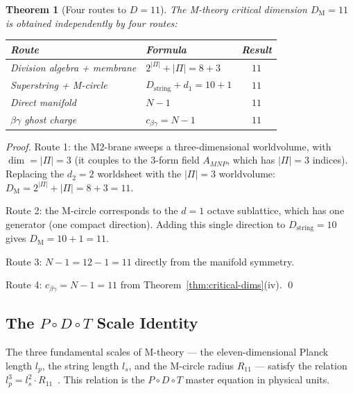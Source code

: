 \documentclass[11pt,a4paper]{article}
\newtheorem{theorem}{Theorem}[section]
\theoremstyle{definition}
\theoremstyle{remark}
\begin{document}
\begin{theorem}[Four routes to $D = 11$]\label{thm:D11}
The M-theory critical dimension $D_{\mathrm{M}} = 11$ is obtained independently by four routes:
\begin{center}
\begin{tabular}{@{}l l c@{}}
\toprule
Route & Formula & Result \\
\midrule
Division algebra + membrane & $2^{|\Pi|} + |\Pi| = 8 + 3$ & $11$ \\
Superstring + M-circle & $D_{\mathrm{string}} + d_{1} = 10 + 1$ & $11$ \\
Direct manifold & $N - 1$ & $11$ \\
$\beta\gamma$ ghost charge & $c_{\beta\gamma} = N - 1$ & $11$ \\
\bottomrule
\end{tabular}
\end{center}
\end{theorem}

\begin{proof}
Route 1: the M$2$-brane sweeps a three-dimensional worldvolume, with $\dim = |\Pi| = 3$ (it couples to the $3$-form field $A_{MNP}$, which has $|\Pi| = 3$ indices). Replacing the $d_{2} = 2$ worldsheet with the $|\Pi| = 3$ worldvolume: $D_{\mathrm{M}} = 2^{|\Pi|} + |\Pi| = 8 + 3 = 11$.

Route 2: the M-circle corresponds to the $d = 1$ octave sublattice, which has one generator (one compact direction). Adding this single direction to $D_{\mathrm{string}} = 10$ gives $D_{\mathrm{M}} = 10 + 1 = 11$.

Route 3: $N - 1 = 12 - 1 = 11$ directly from the manifold symmetry.

Route 4: $c_{\beta\gamma} = N - 1 = 11$ from Theorem~\ref{thm:critical-dims}(iv). \qed
\end{proof}

\subsection{The $P \circ D \circ T$ Scale Identity}\label{subsec:pdt-scale}

The three fundamental scales of M-theory --- the eleven-dimensional Planck length $l_{p}$, the string length $l_{s}$, and the M-circle radius $R_{11}$ --- satisfy the relation $l_{p}^{3} = l_{s}^{2} \cdot R_{11}$~\cite{MiaoLi}. This relation is the $P \circ D \circ T$ master equation in physical units.
\end{document}
